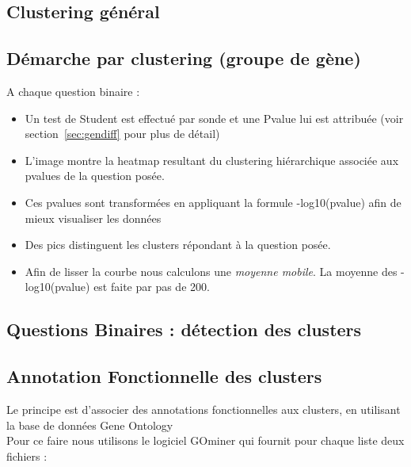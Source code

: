 \documentclass[a4paper]{article}
\begin{document}
\subsection{Clustering général}


\subsection{Démarche par clustering (groupe de gène)}
A chaque question binaire : 
\begin{itemize}
	\item Un test de Student est effectué par sonde et une Pvalue lui est attribuée (voir section~\ref{sec:gendiff} pour plus de détail)
\item L'image montre la heatmap resultant du clustering hiérarchique associée aux pvalues de la question posée. 
\item Ces pvalues sont transformées en appliquant la formule -log10(pvalue) afin de mieux visualiser les données
\item Des pics distinguent les clusters répondant à la question posée.
\item Afin de lisser la courbe nous calculons une \emph{moyenne mobile}. La moyenne des -log10(pvalue) est faite par pas de 200.
\end{itemize}
%
\subsection{Questions Binaires : détection des clusters }

%

\subsection{Annotation Fonctionnelle des clusters}
Le principe est d'associer des annotations fonctionnelles aux clusters, en utilisant la base de données Gene Ontology \cite{go}\\
Pour ce faire nous utilisons le logiciel GOminer \cite{gominer} qui fournit pour chaque liste deux fichiers : 

\par

\end{document}
